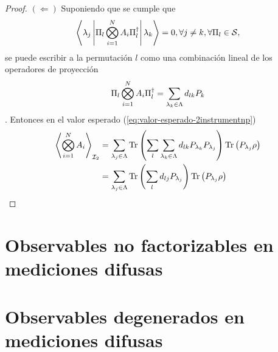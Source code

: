 \begin{proof}
$(\Leftarrow)$ Suponiendo que se cumple que \[ \left\langle\lambda_j\left|\Pi_{l}\bigotimes_{i=1}^{N} A_i\Pi_{l}^{\dagger}\right|\lambda_k\right\rangle=0, \forall j\neq k, \forall \Pi_l \in \mathcal{S},\] se puede  escribir a la permutación $l$ como una combinación lineal de los operadores de proyección\[\Pi_{l}\bigotimes_{i=1}^{N} A_i\Pi_{l}^{\dagger}=\sum_{\lambda_k \in \Lambda}d_{lk}P_{k}\]. Entonces en el valor esperado ({\ref{eq:valor-esperado-2instrumentnp}}) \[\begin{split}\left \langle \bigotimes_{i=1}^{N} A_i \right \rangle_{\mathcal{I}_2}&=\sum_{\lambda_j\in \Lambda} {\rm Tr}\left(\sum_{l}{\sum_{\lambda_k \in \Lambda}d_{lk}P_{\lambda_k}}P_{\lambda_j}\right) {\rm Tr}\left(P_{\lambda_j}\rho\right)\\ &=\sum_{\lambda_j\in \Lambda} {\rm Tr}\left(\sum_{l}d_{lj}P_{\lambda_j}\right) {\rm Tr}\left(P_{\lambda_j}\rho\right)\end{split}\]



\end{proof}

\section{Observables no factorizables en mediciones difusas}
\section{Observables degenerados en mediciones difusas}
